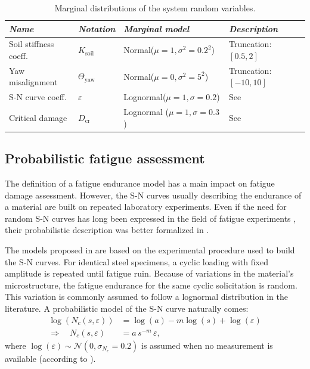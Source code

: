 \begin{table}[h!]
    \centering
    \begin{tabular}{llll}
        \hline
        {\it Name} & {\it Notation} & {\it Marginal model} & {\it Description}\\
        \hline
        Soil stiffness coeff. & $K_{\mathrm{soil}}$ & Normal($\mu=1, \sigma^2=0.2^2$) & Truncation: $[0.5, 2]$\\
        Yaw misalignment & $\Theta_{\mathrm{yaw}}$ & Normal($\mu=0, \sigma^2=5^2$) & Truncation: $[-10, 10]$\\
        S-N curve coeff. & $\varepsilon$ & Lognormal($\mu=1, \sigma=0.2$) & See \cite{guede_2007}\\
        Critical damage & $D_{\mathrm{cr}}$ & Lognormal ($\mu=1, \sigma=0.3$) & See \cite{drexler_musculus_2021}\\\hline
    \end{tabular}
    \caption{Marginal distributions of the system random variables.}
    \label{tab:sys_variables}
\end{table}



\subsection{Probabilistic fatigue assessment}\label{sec:probabilistic_sn}
The definition of a fatigue endurance model has a main impact on fatigue damage assessment. 
However, the S-N curves usually describing the endurance of a material are built on repeated laboratory experiments. 
Even if the need for random S-N curves has long been expressed in the field of fatigue experiments \citep{lieurade_1982_essais_fatigue}, their probabilistic description was better formalized in \citep{guede_2007,sudret_2013_fatigue}. 

The models proposed in \citet{guede_2007} are based on the experimental procedure used to build the S-N curves. 
For identical steel specimens, a cyclic loading with fixed amplitude is repeated until fatigue ruin. 
Because of variations in the material's microstructure, the fatigue endurance for the same cyclic solicitation is random. 
This variation is commonly assumed to follow a lognormal distribution in the literature. 
A probabilistic model of the S-N curve naturally comes: 
\begin{subequations}
    \begin{align}
        \log(N_c(s, \varepsilon)) &= \log(a) - m \log(s) + \log(\varepsilon)\\
        \Rightarrow  \quad N_c(s, \varepsilon) &= a \, s^{-m} \, \varepsilon,
    \end{align}
\end{subequations}
where $\log(\varepsilon) \sim \mathcal{N}(0, \sigma_{N_c}=0.2)$ is assumed when no measurement is available (according to \citealp[Appendix F.5]{dnv_fatigue_2016}). 

